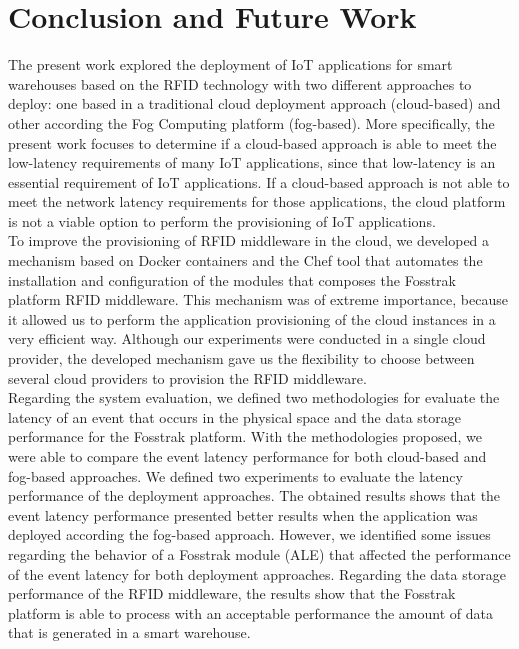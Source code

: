 

\section{Conclusion and Future Work}
\label{sec:conclusion}
The present work explored the deployment of \gls{IoT} applications for smart warehouses based on the
\gls{RFID} technology with two different approaches to deploy: one based in a traditional cloud
deployment approach (cloud-based) and other according the Fog Computing platform (fog-based). More
specifically, the present work focuses to determine if a cloud-based approach is able to meet the
low-latency requirements of many \gls{IoT} applications, since that low-latency is an essential
requirement of \gls{IoT} applications. If a cloud-based approach is not able to meet the network latency
requirements for those applications, the cloud platform is not a viable option to perform the
provisioning of \gls{IoT} applications.\\

To improve the provisioning of \gls{RFID} middleware in the cloud, we developed a mechanism based on
Docker containers and the Chef tool that automates the installation and configuration of the modules
that composes the Fosstrak platform \gls{RFID} middleware. This mechanism was of extreme
importance, because it allowed us to perform the application provisioning of the cloud instances in
a very efficient way. Although our experiments were conducted in a single cloud provider, the developed
mechanism gave us the flexibility to choose between several cloud providers to provision the
\gls{RFID} middleware.\\

Regarding the system evaluation, we defined two methodologies for evaluate the latency of an event that
occurs in the physical space and the data storage performance for the Fosstrak platform. With the
methodologies proposed, we were able to compare the event latency performance for both cloud-based
and fog-based approaches. We defined two experiments to evaluate the latency performance of the
deployment approaches. The obtained results shows that the event latency performance presented better
results when the application was deployed according the fog-based approach. However, we identified
some issues regarding the behavior of a Fosstrak module (\gls{ALE}) that affected the performance
of the event latency for both deployment approaches. Regarding the data storage performance of the
RFID middleware, the results show that the Fosstrak platform is able to process with an acceptable
performance the amount of data that is generated in a smart warehouse.

